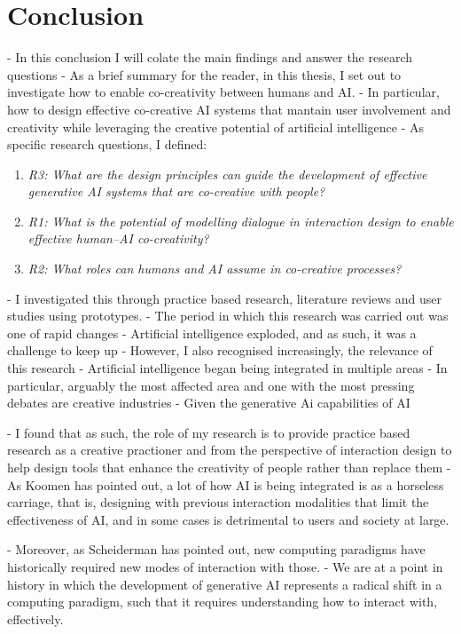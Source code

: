 \chapter{Conclusion}\label{c:conclusion}

- In this conclusion I will colate the main findings and answer the research questions
- As a brief summary for the reader, in this thesis, I set out to investigate how to enable co-creativity between humans and AI. 
- In particular, how to design effective co-creative AI systems that mantain user involvement and creativity while leveraging the creative potential of artificial intelligence
- As specific research questions, I defined: 

\begin{enumerate}
    \item \textit{R3: What are the design principles can guide the development of effective generative AI systems that are co-creative with people?}
    \item \textit{R1: What is the potential of modelling dialogue in interaction design to enable effective human–AI co-creativity?}
    \item \textit{R2: What roles can humans and AI assume in co-creative processes?}
\end{enumerate}

- I investigated this through practice based research, literature reviews and user studies using prototypes. 
- The period in which this research was carried out was one of rapid changes
- Artificial intelligence exploded, and as such, it was a challenge to keep up
- However, I also recognised increasingly, the relevance of this research
- Artificial intelligence began being integrated in multiple areas
- In particular, arguably the most affected area and one with the most pressing debates are creative industries
- Given the generative Ai capabilities of AI

- I found that as such, the role of my research is to provide practice based research as a creative practioner and from the perspective of interaction design to help design tools that enhance the creativity of people rather than replace them
- As Koomen has pointed out, a lot of how AI is being integrated is as a horseless carriage, that is, designing with previous interaction modalities that limit the effectiveness of AI, and in some cases is detrimental to users and society at large. 

- Moreover, as Scheiderman has pointed out, new computing paradigms have historically required new modes of interaction with those. 
- We are at a point in history in which the development of generative AI represents a radical shift in a computing paradigm, such that it requires understanding how to interact with, effectively. 


